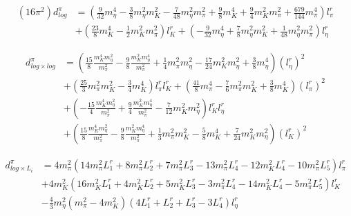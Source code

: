 \documentclass[12pt,a4paper]{article}
\begin{document}
\begin{align}
	(16 \pi^2) d^{\pi}_{log} &= \left( \frac{9}{32} m_{\eta}^4 - \frac{3}{8} m_{\eta}^2 m_{K}^2 - \frac{7}{48} m_{\eta}^2 m_{\pi}^2 + \frac{9}{8} m_{K}^4 + \frac{9}{4} m_{K}^2 m_{\pi}^2 + \frac{679}{144} m_{\pi}^4 \right) l_{\pi}^r \nonumber \\
	& + \left( \frac{23}{8} m_{K}^4 - \frac{1}{2} m_{K}^2 m_{\pi}^2 \right) l_{K}^r + \left( -\frac{9}{32} m_{\eta}^4 + \frac{7}{8} m_{\eta}^2 m_{K}^2 + \frac{1}{48} m_{\eta}^2 m_{\pi}^2 \right) l_{\eta}^r \label{dlog}
\end{align}

\begin{align}
	d^{\pi}_{log \times log} & = \left(\frac{15}{8} \frac{m_{K}^4 m_{\eta}^2}{m_{\pi}^2} - \frac{9}{8} \frac{m_{K}^2 m_{\eta}^4}{m_{\pi}^2} + \frac{1}{4} m_{\pi}^2 m_{\eta}^2 - \frac{17}{24}  m_{K}^2 m_{\eta}^2 + \frac{3}{8} m_{\eta}^4 \right) \left( l_{\eta}^r \right)^2
\nonumber\\&
 + \left(\frac{25}{3} m_{\pi}^2 m_{K}^2 - \frac{3}{4} m_{K}^4 \right) l_{\pi}^r l_{K}^r
 + \left(\frac{41}{8} m_{\pi}^4 - \frac{7}{6} m_{\pi}^2 m_{K}^2 + \frac{3}{8} m_{K}^4 \right) \left( l_{\pi}^r \right)^2
 \nonumber \\ 	&
 + \left(- \frac{15}{4} \frac{m_{K}^4 m_{\eta}^2}{m_{\pi}^2} + \frac{9}{4} \frac{m_{K}^2 m_{\eta}^4}{m_{\pi}^2} - \frac{7}{12} m_{K}^2 m_{\eta}^2 \right) l_{K}^r l_{\eta}^r \nonumber \\ 
	& + \left( \frac{15}{8} \frac{m_{K}^4 m_{\eta}^2}{m_{\pi}^2} - \frac{9}{8} \frac{m_{K}^2 m_{\eta}^4}{m_{\pi}^2} + \frac{1}{3} m_{\pi}^2 m_{K}^2 - \frac{5}{8} m_{K}^4 + \frac{7}{24} m_{K}^2 m_{\eta}^2 \right) \left( l_{K}^r \right)^2 \label{dloglog}
\end{align}

\begin{align}
	d^{\pi}_{log \times L_i} & = 4 m_{\pi}^2 \left(14 m_{\pi}^2 L_1^r + 8 m_{\pi}^2 L_2^r + 7 m_{\pi}^2 L_3^r - 13 m_{\pi}^2 L_4^r - 12 m_{K}^2 L_4^r - 10 m_{\pi}^2 L_5^r \right) l_{\pi}^r  \nonumber \\
&  + 4 m_{K}^2 \left(16 m_{K}^2 L_1^r + 4 m_{K}^2 L_2^r + 5 m_{K}^2 L_3^r - 3 m_{\pi}^2 L_4^r - 14 m_{K}^2 L_4^r - 5 m_{\pi}^2 L_5^r   \right) l_{K}^r \nonumber \\
&  -\frac{4}{3} m_{\eta}^2 \left( m_{\pi}^2 - 4 m_{K}^2 \right) \left( 4 L_1^r + L_2^r + L_3^r - 3 L_4^r \right) l_{\eta}^r 
\end{align}
\end{document}
